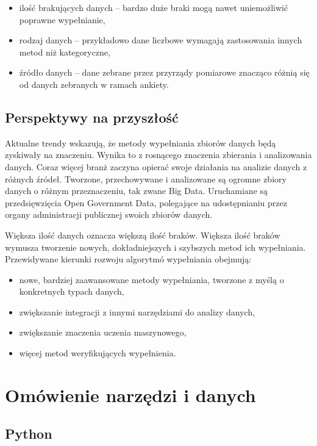 \documentclass[12pt,twoside]{article}
\begin{document}
\begin{itemize}[label=-,labelsep=0.4cm, leftmargin=1.25cm]
    \item ilość brakujących danych -- bardzo duże braki mogą nawet uniemożliwić poprawne wypełnianie,
    \item rodzaj danych -- przykładowo dane liczbowe wymagają zastosowania innych metod niż kategoryczne,
    \item źródło danych -- dane zebrane przez przyrządy pomiarowe znacząco różnią się
          od danych zebranych w ramach ankiety.
\end{itemize}
\subsection{Perspektywy na przyszłość}

Aktualne trendy wskazują, że metody wypełniania zbiorów danych będą zyskiwały na znaczeniu.
Wynika to z rosnącego znaczenia zbierania i analizowania danych. Coraz więcej branż zaczyna opierać swoje działania
na analizie danych z różnych źródeł.
Tworzone, przechowywane i analizowane są ogromne zbiory danych o różnym przeznaczeniu, tak zwane Big Data. \cite{bigata}
Uruchamiane są przedsięwzięcia Open Government Data, polegające na udostępnianiu przez organy administracji publicznej
swoich zbiorów danych. \cite{ogd} \cite{ogdpl}

Większa ilość danych oznacza większą ilość braków. Większa ilość braków wymusza tworzenie nowych,
dokładniejszych i szybszych metod ich wypełniania. Przewidywane kierunki rozwoju algorytmó wypełniania obejmują: \cite{future}

\begin{itemize}[label=-,labelsep=0.4cm, leftmargin=1.25cm]
    \item nowe, bardziej zaawansowane metody wypełniania, tworzone z myślą o konkretnych typach danych,
    \item zwiększanie integracji z innymi narzędziami do analizy danych,
    \item zwiększanie znaczenia uczenia maszynowego,
    \item więcej metod weryfikujących wypełnienia.
\end{itemize}

\clearpage
\section{Omówienie narzędzi i danych}

\subsection{Python}
\end{document}
